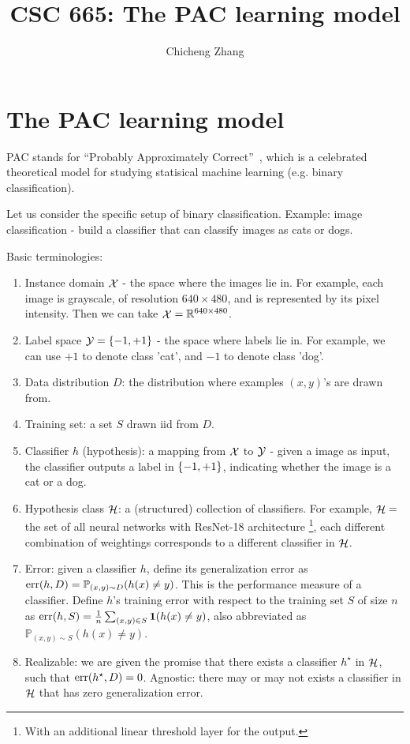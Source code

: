 \documentclass{article}
\title{CSC 665: The PAC learning model}
\author{Chicheng Zhang}
\DeclareMathOperator*{\err}{{\rm err}}
\DeclareMathOperator*{\Xcal}{{\cal X}}
\DeclareMathOperator*{\Hcal}{{\cal H}}
\DeclareMathOperator*{\Ycal}{{\cal Y}}
\newcommand{\RR}{\mathbb{R}} %
\newcommand{\PP}{\mathbb{P}}
\newcommand*{\one}{{\bf 1}}
\begin{document}
\maketitle

\section{The PAC learning model}

PAC stands for ``Probably Approximately Correct''~\cite{valiant1984theory}, which is a celebrated theoretical model for studying statisical machine learning (e.g. binary classification).

Let us consider the specific setup of binary classification. Example: image classification - build a classifier
that can classify images as cats or dogs.

Basic terminologies:
\begin{enumerate}
\item Instance domain $\Xcal$ - the space where the images lie in. For example,
each image is grayscale, of resolution $640 \times 480$, and is represented by its pixel intensity.
Then we can take $\Xcal = \RR^{640 \times 480}$.

\item Label space $\Ycal = \cbr{-1, +1}$ - the space where labels lie in.
For example, we can use $+1$ to denote class 'cat', and $-1$ to denote class 'dog'.

\item Data distribution $D$: the distribution where examples $(x,y)$'s are drawn from.

\item Training set: a set $S$ drawn iid from $D$.

\item Classifier $h$ (hypothesis): a mapping from $\Xcal$ to $\Ycal$ - given a image as input, the
classifier outputs a label in $\cbr{-1,+1}$, indicating whether the image is a cat or a dog.

\item Hypothesis class $\Hcal$: a (structured) collection of classifiers. For example,
$\Hcal = $ the set of all neural networks with ResNet-18 architecture
\footnote{With an additional linear threshold layer for the output.}, each different combination of weightings corresponds to a different classifier in $\Hcal$.

\item Error: given a classifier $h$, define its generalization error as
$\err(h, D) = \PP_{(x,y) \sim D}(h(x) \neq y)$. This is the performance
measure of a classifier. Define $h$'s training error with respect
to the training set $S$ of size $n$ as $\err(h, S) = \frac{1}{n} \sum_{(x,y) \in S} \one(h(x) \neq y)$,
also abbreviated as $\PP_{(x,y) \sim S}(h(x) \neq y)$.

\item Realizable: we are given the promise that there exists a classifier $h^\star$ in $\Hcal$, such that
 $\err(h^\star, D) = 0$. Agnostic: there may or may not exists a classifier in $\Hcal$
 that has zero generalization error.
\end{enumerate}
\end{document}
